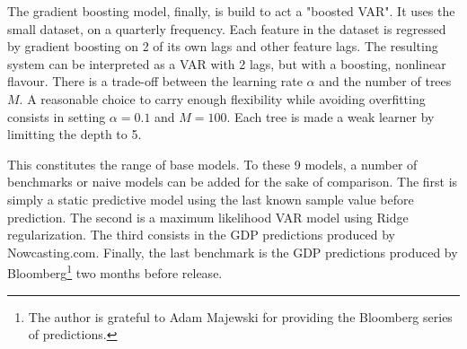 \newpage

The gradient boosting model, finally, is build to act a "boosted VAR". It uses the small dataset, on a quarterly frequency. Each feature in the dataset is regressed by gradient boosting on 2 of its own lags and other feature lags. The resulting system can be interpreted as a VAR with 2 lags, but with a boosting, nonlinear flavour. There is a trade-off between the learning rate $\alpha$ and the number of trees $M$. A reasonable choice to carry enough flexibility while avoiding overfitting consists in setting $\alpha=0.1$ and $M=100$. Each tree is made a weak learner by limitting the depth to 5.

This constitutes the range of base models. To these 9 models, a number of benchmarks or naive models can be added for the sake of comparison. The first is simply a static predictive model using the last known sample value before prediction. The second is a maximum likelihood VAR model using Ridge regularization. The third  consists in the GDP predictions produced by Nowcasting.com. Finally, the last benchmark is the GDP predictions produced by Bloomberg\footnote{The author is grateful to Adam Majewski for providing the Bloomberg series of predictions.} two months before release.



